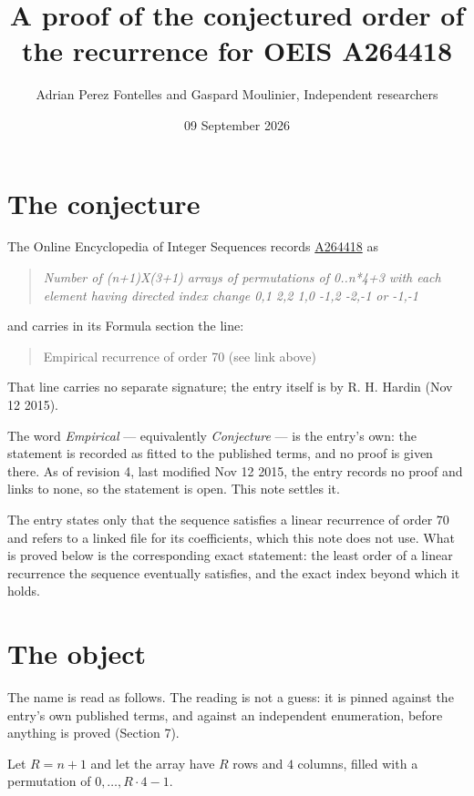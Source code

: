 \documentclass[11pt]{article}
\title{A proof of the conjectured order of the recurrence for OEIS A264418}
\author{Adrian Perez Fontelles and Gaspard Moulinier, Independent researchers}
\date{09 September 2026}
\theoremstyle{definition}
\begin{document}
\maketitle
\section{The conjecture}

The Online Encyclopedia of Integer Sequences records \href{https://oeis.org/A264418}{A264418} as

\begin{quote}\itshape Number of (n+1)X(3+1) arrays of permutations of 0..n*4+3 with each element having directed index change 0,1 2,2 1,0 -1,2 -2,-1 or -1,-1\end{quote}

and carries in its Formula section the line:

\begin{quote}\ttfamily Empirical recurrence of order 70 (see link above)\end{quote}

That line carries no separate signature; the entry itself is by R. H. Hardin (Nov 12 2015).

The word {\itshape Empirical} --- equivalently {\itshape Conjecture} --- is the entry's own: the statement is recorded as fitted to the published terms, and no proof is given there. As of revision 4, last modified Nov 12 2015, the entry records no proof and links to none, so the statement is open. This note settles it.

The entry states only that the sequence satisfies a linear recurrence of order $70$ and refers to a linked file for its coefficients, which this note does not use. What is proved below is the corresponding exact statement: the least order of a linear recurrence the sequence eventually satisfies, and the exact index beyond which it holds.

\section{The object}

The name is read as follows. The reading is not a guess: it is pinned against the entry's own published terms, and against an independent enumeration, before anything is proved (Section 7).

Let $R = n + 1$ and let the array have $R$ rows and $4$ columns, filled with a permutation of $0,\dots,R\cdot4-1$.
\end{document}
